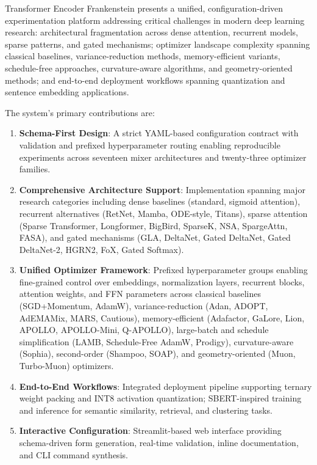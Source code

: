 \documentclass[11pt,a4paper]{article}
\begin{document}
Transformer Encoder Frankenstein presents a unified, configuration-driven experimentation platform addressing critical challenges in modern deep learning research: architectural fragmentation across dense attention, recurrent models, sparse patterns, and gated mechanisms; optimizer landscape complexity spanning classical baselines, variance-reduction methods, memory-efficient variants, schedule-free approaches, curvature-aware algorithms, and geometry-oriented methods; and end-to-end deployment workflows spanning quantization and sentence embedding applications.

The system's primary contributions are:
\begin{enumerate}[leftmargin=*]
    \item \textbf{Schema-First Design}: A strict YAML-based configuration contract with validation and prefixed hyperparameter routing enabling reproducible experiments across seventeen mixer architectures and twenty-three optimizer families.
    \item \textbf{Comprehensive Architecture Support}: Implementation spanning major research categories including dense baselines (standard, sigmoid attention), recurrent alternatives (RetNet, Mamba, ODE-style, Titans), sparse attention (Sparse Transformer, Longformer, BigBird, SparseK, NSA, SpargeAttn, FASA), and gated mechanisms (GLA, DeltaNet, Gated DeltaNet, Gated DeltaNet-2, HGRN2, FoX, Gated Softmax).
    \item \textbf{Unified Optimizer Framework}: Prefixed hyperparameter groups enabling fine-grained control over embeddings, normalization layers, recurrent blocks, attention weights, and FFN parameters across classical baselines (SGD+Momentum, AdamW), variance-reduction (Adan, ADOPT, AdEMAMix, MARS, Cautious), memory-efficient (Adafactor, GaLore, Lion, APOLLO, APOLLO-Mini, Q-APOLLO), large-batch and schedule simplification (LAMB, Schedule-Free AdamW, Prodigy), curvature-aware (Sophia), second-order (Shampoo, SOAP), and geometry-oriented (Muon, Turbo-Muon) optimizers.
    \item \textbf{End-to-End Workflows}: Integrated deployment pipeline supporting ternary weight packing and INT8 activation quantization; SBERT-inspired training and inference for semantic similarity, retrieval, and clustering tasks.
    \item \textbf{Interactive Configuration}: Streamlit-based web interface providing schema-driven form generation, real-time validation, inline documentation, and CLI command synthesis.
\end{enumerate}
\end{document}
